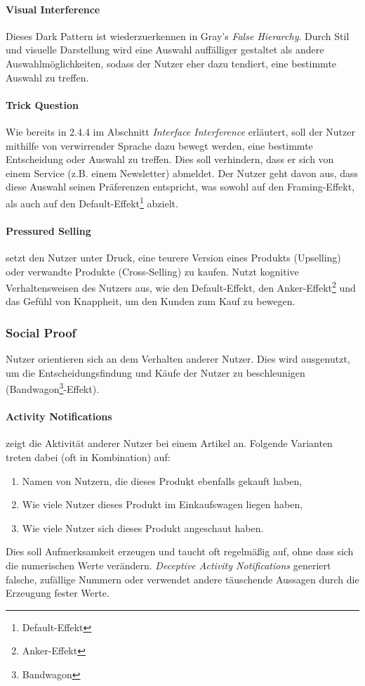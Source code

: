 \documentclass[a4paper]{article}
\begin{document}
\paragraph{Visual Interference}
Dieses Dark Pattern ist wiederzuerkennen in Gray's \textit{False Hierarchy}. 
Durch Stil und visuelle Darstellung wird eine Auswahl auffälliger gestaltet als andere Auswahlmöglichkeiten, sodass der Nutzer eher dazu tendiert, eine bestimmte Auswahl zu treffen.

\paragraph{Trick Question}
Wie bereits in 2.4.4 im Abschnitt \textit{Interface Interference} erläutert, soll der Nutzer mithilfe von verwirrender Sprache dazu bewegt werden, eine bestimmte Entscheidung oder Auswahl zu treffen. Dies soll verhindern, dass er sich von einem Service (z.B. einem Newsletter) abmeldet. Der Nutzer geht davon aus, dass diese Auswahl seinen Präferenzen entspricht, was sowohl auf den Framing-Effekt, als auch auf den Default-Effekt\footnote{\label{foot:6} Default-Effekt} abzielt.

\paragraph{Pressured Selling} setzt den Nutzer unter Druck, eine teurere Version eines Produkts (Upselling) oder verwandte Produkte (Cross-Selling) zu kaufen. Nutzt kognitive Verhaltensweisen des Nutzers aus, wie den Default-Effekt, den Anker-Effekt\footnote{\label{foot:7} Anker-Effekt} und das Gefühl von Knappheit, um den Kunden zum Kauf zu bewegen.


\subsubsection{Social Proof}
Nutzer orientieren sich an dem Verhalten anderer Nutzer. Dies wird ausgenutzt, um die Entscheidungsfindung und Käufe der Nutzer zu beschleunigen (Bandwagon\footnote{\label{foot:5} Bandwagon}-Effekt).

\paragraph{Activity Notifications} zeigt die Aktivität anderer Nutzer bei einem Artikel an. Folgende Varianten treten dabei (oft in Kombination) auf: 
\begin{enumerate}[label=\arabic*)]
	\item{Namen von Nutzern, die dieses Produkt ebenfalls gekauft haben,}
	\item{Wie viele Nutzer dieses Produkt im Einkaufswagen liegen haben,}
	\item{Wie viele Nutzer sich dieses Produkt angeschaut haben.}
\end{enumerate}
Dies soll Aufmerksamkeit erzeugen und taucht oft regelmäßig auf, ohne dass sich die numerischen Werte verändern. \textit{Deceptive Activity Notifications} generiert falsche, zufällige Nummern oder verwendet andere täuschende Aussagen durch die Erzeugung fester Werte.
\end{document}
